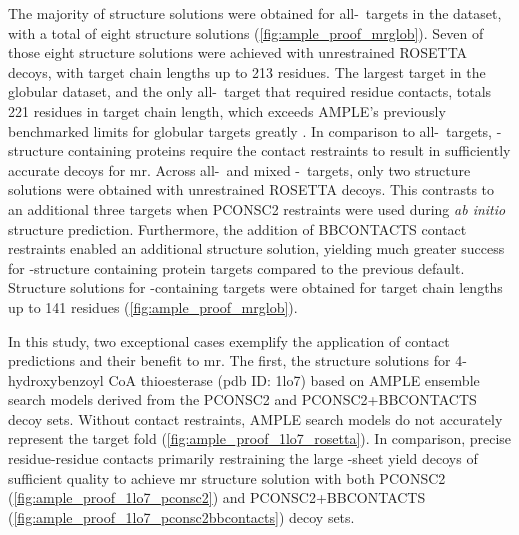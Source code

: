 The majority of structure solutions were obtained for all-\textalpha\ targets in the dataset, with a total of eight structure solutions (\cref{fig:ample_proof_mrglob}). Seven of those eight structure solutions were achieved with unrestrained ROSETTA decoys, with target chain lengths up to 213 residues. The largest target in the globular dataset, and the only all-\textalpha\ target that required residue contacts, totals 221 residues in target chain length, which exceeds AMPLE's previously benchmarked limits for globular targets greatly \cite{Bibby2012-lm}. In comparison to all-\textalpha\ targets, \textbeta-structure containing proteins require the contact restraints to result in sufficiently accurate decoys for \gls{mr}. Across all-\textbeta\ and mixed \textalpha-\textbeta\ targets, only two structure solutions were obtained with unrestrained ROSETTA decoys. This contrasts to an additional three targets when PCONSC2 restraints were used during \textit{ab initio} structure prediction. Furthermore, the addition of BBCONTACTS contact restraints enabled an additional structure solution, yielding much greater success for \textbeta-structure containing protein targets compared to the previous default. Structure solutions for \textbeta-containing targets were obtained for target chain lengths up to 141 residues (\cref{fig:ample_proof_mrglob}).

In this study, two exceptional cases exemplify the application of contact predictions and their benefit to \gls{mr}. The first, the structure solutions for 4-hydroxybenzoyl CoA thioesterase (\gls{pdb} ID: 1lo7) based on AMPLE ensemble search models derived from the PCONSC2 and PCONSC2+BBCONTACTS decoy sets. Without contact restraints, AMPLE search models do not accurately represent the target fold (\cref{fig:ample_proof_1lo7_rosetta}). In comparison, precise residue-residue contacts primarily restraining the large \textbeta-sheet yield decoys of sufficient quality to achieve \gls{mr} structure solution with both PCONSC2 (\cref{fig:ample_proof_1lo7_pconsc2}) and PCONSC2+BBCONTACTS (\cref{fig:ample_proof_1lo7_pconsc2bbcontacts}) decoy sets.

